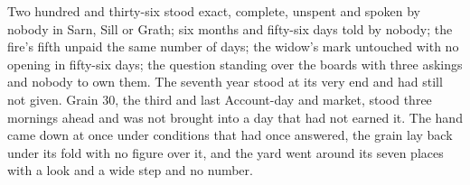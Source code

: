 Two hundred and thirty-six stood exact, complete, unspent and spoken by nobody in Sarn, Sill or Grath; six months and fifty-six days told by nobody; the fire's fifth unpaid the same number of days; the widow's mark untouched with no opening in fifty-six days; the question standing over the boards with three askings and nobody to own them. The seventh year stood at its very end and had still not given. Grain 30, the third and last Account-day and market, stood three mornings ahead and was not brought into a day that had not earned it. The hand came down at once under conditions that had once answered, the grain lay back under its fold with no figure over it, and the yard went around its seven places with a look and a wide step and no number.
